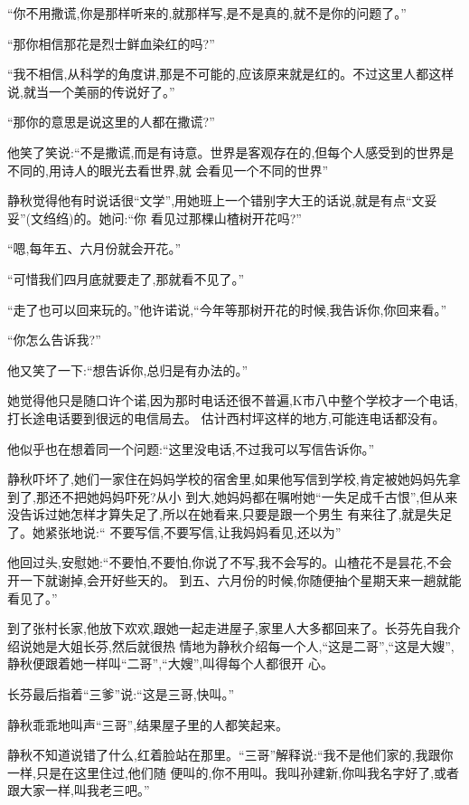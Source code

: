 ﻿\documentclass[12pt]{article}
\begin{document}
``你不用撒谎,你是那样听来的,就那样写,是不是真的,就不是你的问题了。''

``那你相信那花是\myrule 烈士鲜血染红的吗?''

``我不相信,从科学的角度讲,那是不可能的,应该原来就是红的。不过这里人都这样说,就当一个美丽的传说好了。''

``那你的意思是说这里的人都\myrule 在撒谎?''

他笑了笑说:``不是撒谎,而是有诗意。世界是客观存在的,但每个人感受到的世界是不同的,用诗人的眼光去看世界,就
会看见一个不同的世界\myrule ''

静秋觉得他有时说话很``文学'',用她班上一个错别字大王的话说,就是有点``文妥妥''(文绉绉)的。她问:``你
\myrule 看见过那棵山楂树开花吗?''

``嗯,每年五、六月份就会开花。''

``可惜我们四月底就要走了,那就看不见了。''

``走了也可以回来玩的。''他许诺说,``今年等那树开花的时候,我告诉你,你回来看。''

``你怎么告诉我?''

他又笑了一下:``想告诉你,总归是有办法的。''

她觉得他只是随口许个诺,因为那时电话还很不普遍,K市八中整个学校才一个电话,打长途电话要到很远的电信局去。
估计西村坪这样的地方,可能连电话都没有。

他似乎也在想着同一个问题:``这里没电话,不过我可以写信告诉你。''

静秋吓坏了,她们一家住在妈妈学校的宿舍里,如果他写信到学校,肯定被她妈妈先拿到了,那还不把她妈妈吓死?从小
到大,她妈妈都在嘱咐她``一失足成千古恨'',但从来没告诉过她怎样才算失足了,所以在她看来,只要是跟一个男生
有来往了,就是失足了。她紧张地说:`` 不要写信,不要写信,让我妈妈看见,还以为\myrule ''

他回过头,安慰她:``不要怕,不要怕,你说了不写,我不会写的。山楂花不是昙花,不会开一下就谢掉,会开好些天的。
到五、六月份的时候,你随便抽个星期天来一趟就能看见了。''

到了张村长家,他放下欢欢,跟她一起走进屋子,家里人大多都回来了。长芬先自我介绍说她是大姐长芬,然后就很热
情地为静秋介绍每一个人,``这是二哥'',``这是大嫂'',静秋便跟着她一样叫``二哥'',``大嫂'',叫得每个人都很开
心。

长芬最后指着``三爹''说:``这是三哥,快叫。''

静秋乖乖地叫声``三哥'',结果屋子里的人都笑起来。

静秋不知道说错了什么,红着脸站在那里。``三哥''解释说:``我不是他们家的,我跟你一样,只是在这里住过,他们随
便叫的,你不用叫。我叫孙建新,你叫我名字好了,或者跟大家一样,叫我老三吧。''
\end{document}
